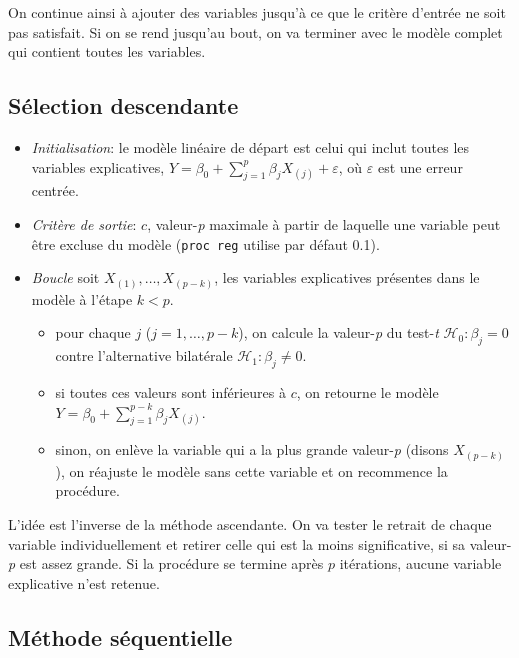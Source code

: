 \documentclass[
  11pt,
  letterpaper,
]{book}
\providecommand{\tightlist}{%
  \setlength{\itemsep}{0pt}\setlength{\parskip}{0pt}}
\theoremstyle{definition}
\theoremstyle{definition}
\theoremstyle{definition}
\theoremstyle{remark}
\begin{document}
On continue ainsi à ajouter des variables jusqu'à ce que le critère d'entrée ne soit pas satisfait. Si on se rend jusqu'au bout, on va terminer avec le modèle complet qui contient toutes les variables.

\hypertarget{suxe9lection-descendante}{%
\subsection{Sélection descendante}\label{suxe9lection-descendante}}

\begin{itemize}
\tightlist
\item
  \emph{Initialisation}: le modèle linéaire de départ est celui qui inclut toutes les variables explicatives, \(Y=\beta_0+\sum_{j=1}^p \beta_j X_{(j)}+\varepsilon\), où \(\varepsilon\) est une erreur centrée.
\item
  \emph{Critère de sortie}: \(c\), valeur-\emph{p} maximale à partir de laquelle une variable peut être excluse du modèle (\texttt{proc\ reg} utilise par défaut 0.1).
\item
  \emph{Boucle} soit \(X_{(1)}, \ldots, X_{(p-k)}\), les variables explicatives présentes dans le modèle à l'étape \(k<p\).

  \begin{itemize}
  \tightlist
  \item
    pour chaque \(j\) (\(j =1, \ldots, p-k\)), on calcule la valeur-\emph{p} du test-\emph{t} \(\mathcal{H}_0: \beta_{j}=0\) contre l'alternative bilatérale \(\mathcal{H}_1: \beta_{j} \neq 0\).
  \item
    si toutes ces valeurs sont inférieures à \(c\), on retourne le modèle \(Y=\beta_0 + \sum_{j=1}^{p-k} \beta_j X_{(j)}\).
  \item
    sinon, on enlève la variable qui a la plus grande valeur-\emph{p} (disons \(X_{(p-k)}\)), on réajuste le modèle sans cette variable et on recommence la procédure.
  \end{itemize}
\end{itemize}

L'idée est l'inverse de la méthode ascendante. On va tester le retrait de chaque variable individuellement et retirer celle qui est la moins significative, si sa valeur-\emph{p} est assez grande. Si la procédure se termine après \(p\) itérations, aucune variable explicative n'est retenue.

\hypertarget{muxe9thode-suxe9quentielle}{%
\subsection{Méthode séquentielle}\label{muxe9thode-suxe9quentielle}}
\end{document}

